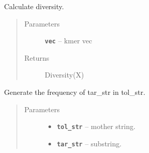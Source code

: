 \documentclass[letterpaper,10pt,english]{sphinxmanual}
\begin{document}
\begin{fulllineitems}
\label{reference/PyDNAnacutil:PyDNAnacutil.Diversity}
Calculate diversity.
\begin{quote}\begin{description}
\item[{Parameters}] \leavevmode
\textbf{\texttt{vec}} -- kmer vec

\item[{Returns}] \leavevmode
Diversity(X)

\end{description}\end{quote}

\end{fulllineitems}


\begin{fulllineitems}
\label{reference/PyDNAnacutil:PyDNAnacutil.FindRevcomp}
\end{fulllineitems}


\begin{fulllineitems}
\label{reference/PyDNAnacutil:PyDNAnacutil.Frequency}
Generate the frequency of tar\_str in tol\_str.
\begin{quote}\begin{description}
\item[{Parameters}] \leavevmode\begin{itemize}
\item {} 
\textbf{\texttt{tol\_str}} -- mother string.

\item {} 
\textbf{\texttt{tar\_str}} -- substring.

\end{itemize}

\end{description}\end{quote}

\end{fulllineitems}

\end{document}
